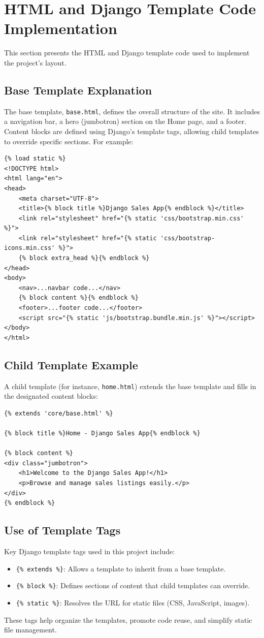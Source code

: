 \documentclass[12pt]{article}
\begin{document}
\section{HTML and Django Template Code Implementation}
This section presents the HTML and Django template code used to implement the project's layout.

\subsection{Base Template Explanation}
The base template, \texttt{base.html}, defines the overall structure of the site. 
It includes a navigation bar, a hero (jumbotron) section on the Home page, and a footer. 
Content blocks are defined using Django's template tags, allowing child templates to override 
specific sections. For example:

\begin{verbatim}
{% load static %}
<!DOCTYPE html>
<html lang="en">
<head>
    <meta charset="UTF-8">
    <title>{% block title %}Django Sales App{% endblock %}</title>
    <link rel="stylesheet" href="{% static 'css/bootstrap.min.css' %}">
    <link rel="stylesheet" href="{% static 'css/bootstrap-icons.min.css' %}">
    {% block extra_head %}{% endblock %}
</head>
<body>
    <nav>...navbar code...</nav>
    {% block content %}{% endblock %}
    <footer>...footer code...</footer>
    <script src="{% static 'js/bootstrap.bundle.min.js' %}"></script>
</body>
</html>
\end{verbatim}

\subsection{Child Template Example}
A child template (for instance, \texttt{home.html}) extends the base template and fills in the 
designated content blocks:

\begin{verbatim}
{% extends 'core/base.html' %}

{% block title %}Home - Django Sales App{% endblock %}

{% block content %}
<div class="jumbotron">
    <h1>Welcome to the Django Sales App!</h1>
    <p>Browse and manage sales listings easily.</p>
</div>
{% endblock %}
\end{verbatim}

\subsection{Use of Template Tags}
Key Django template tags used in this project include:
\begin{itemize}
    \item \verb|{% extends %}|: Allows a template to inherit from a base template.
    \item \verb|{% block %}|: Defines sections of content that child templates can override.
    \item \verb|{% static %}|: Resolves the URL for static files (CSS, JavaScript, images).
\end{itemize}
These tags help organize the templates, promote code reuse, and simplify static file management.
\end{document}
